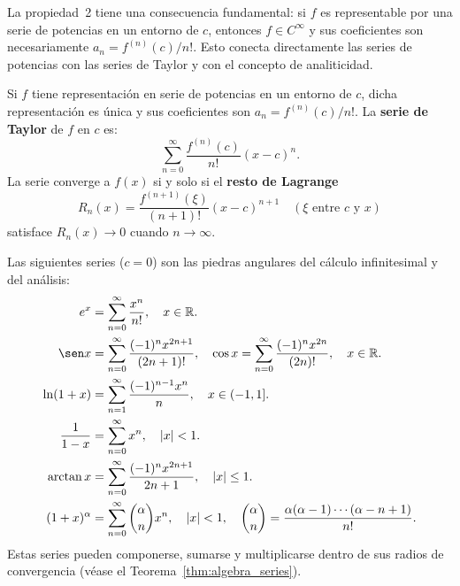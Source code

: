 \begin{rem}
La propiedad~2 tiene una consecuencia fundamental: si $f$ es
representable por una serie de potencias en un entorno de $c$,
entonces $f \in C^\infty$ y sus coeficientes son necesariamente
$a_n = f^{(n)}(c)/n!$. Esto conecta directamente las series de
potencias con las series de Taylor y con el concepto de analiticidad.
\end{rem}

\begin{theorem}
\label{thm:taylor}
Si $f$ tiene representación en serie de potencias en un entorno de
$c$, dicha representación es única y sus coeficientes son
$a_n = f^{(n)}(c)/n!$. La \textbf{serie de Taylor} de $f$ en $c$ es:
\[
    \sum_{n=0}^\infty \frac{f^{(n)}(c)}{n!}(x-c)^n.
\]
La serie converge a $f(x)$ si y solo si el \textbf{resto de Lagrange}
\[
    R_n(x) = \frac{f^{(n+1)}(\xi)}{(n+1)!}(x-c)^{n+1}
    \quad (\xi \text{ entre } c \text{ y } x)
\]
satisface $R_n(x) \to 0$ cuando $n \to \infty$.
\end{theorem}

\begin{rem}
Las siguientes series ($c=0$) son las piedras angulares del cálculo
infinitesimal y del análisis:
\begin{align*}
    e^x &= \sum_{n=0}^\infty \frac{x^n}{n!}, \quad x \in \mathbb{R}.\\
    \sen x &= \sum_{n=0}^\infty \frac{(-1)^n x^{2n+1}}{(2n+1)!},
    \quad \cos x = \sum_{n=0}^\infty \frac{(-1)^n x^{2n}}{(2n)!},
    \quad x \in \mathbb{R}.\\
    \ln(1+x) &= \sum_{n=1}^\infty \frac{(-1)^{n-1}x^n}{n},
    \quad x \in (-1,1].\\
    \frac{1}{1-x} &= \sum_{n=0}^\infty x^n, \quad |x| < 1.\\
    \arctan x &= \sum_{n=0}^\infty \frac{(-1)^n x^{2n+1}}{2n+1},
    \quad |x| \leq 1.\\
    (1+x)^\alpha &= \sum_{n=0}^\infty \binom{\alpha}{n}x^n,
    \quad |x| < 1, \quad
    \binom{\alpha}{n} = \frac{\alpha(\alpha-1)\cdots(\alpha-n+1)}{n!}.
\end{align*}
Estas series pueden componerse, sumarse y multiplicarse dentro de sus
radios de convergencia (véase el Teorema~\ref{thm:algebra_series}).
\end{rem}

